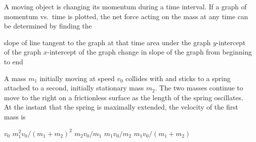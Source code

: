 \documentclass{../../../oss-apphys-exam}
\newcounter{lastmc}
\begin{document}
\begin{questions}
  \question A moving object is changing its momentum during a time interval. If
  a graph of momentum vs.\ time is plotted, the net force acting on the mass at
  any time can be determined by finding the
  \begin{choices}
    \choice slope of line tangent to the graph at that time
    \choice area under the graph
    \choice $y$-intercept of the graph
    \choice $x$-intercept of the graph
    \choice change in slope of the graph from beginning to end
  \end{choices}
  
  \question A mass $m_1$ initially moving at speed $v_0$ collides with and
  sticks to a spring attached to a second, initially stationary mass $m_2$. The
  two masses continue to move to the right on a frictionless surface as the
  length of the spring oscillates. At the instant that the spring is maximally
  extended, the velocity of the first mass is
  \begin{center}
  \end{center}
  \begin{choices}
    \choice $v_0$
    \choice $m_1^2v_0/(m_1+m_2)^2$
    \choice $m_2v_0/m_1$
    \choice $m_1v_0/m_2$
    \choice $m_1v_0/(m_1+m_2)$
  \end{choices}
\end{questions}
\setcounter{lastmc}{\value{question}}
\newpage



  
\end{document}
